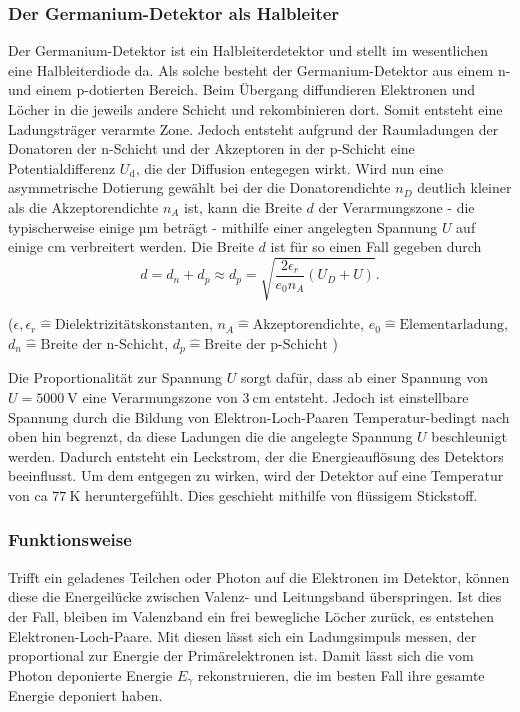 \subsubsection{Der Germanium-Detektor als Halbleiter}
Der Germanium-Detektor ist ein Halbleiterdetektor und stellt im wesentlichen eine Halbleiterdiode da. Als solche besteht der Germanium-Detektor aus einem n- und einem p-dotierten Bereich. Beim Übergang diffundieren Elektronen und Löcher in die jeweils andere Schicht und rekombinieren dort. Somit entsteht eine Ladungsträger verarmte Zone. Jedoch entsteht aufgrund der Raumladungen der Donatoren der n-Schicht und der Akzeptoren in der p-Schicht eine Potentialdifferenz $U_\text{d}$, die der Diffusion entegegen wirkt. Wird nun eine asymmetrische Dotierung gewählt bei der die Donatorendichte $n_D$ deutlich kleiner als die Akzeptorendichte $n_A$ ist, kann die Breite $d$ der Verarmungszone - die typischerweise einige µm beträgt - mithilfe einer angelegten Spannung $U$ auf einige cm verbreitert werden. Die Breite $d$ ist für so einen Fall gegeben durch
\begin{equation}
 d = d_n + d_p \approx d_p = \sqrt{\frac{2 \epsilon_r }{e_0 n_A}(U_D + U)}.
\end{equation}
\begin{center}
\tiny{($ \epsilon, \epsilon_r \hat{=} \text{Dielektrizitätskonstanten} $, $ n_A \hat{=} \text{Akzeptorendichte} $, $e_0 \hat{=} \text{Elementarladung} $, $d_n \hat{=} \text{Breite der n-Schicht}$, $d_p \hat{=} \text{Breite der p-Schicht}$ )}
\end{center}
Die Proportionalität zur Spannung $U$ sorgt dafür, dass ab einer Spannung von $U = \SI{5000}{\volt}$ eine Verarmungszone von  $\SI{3}{\centi \meter}$ entsteht. Jedoch ist einstellbare Spannung durch die Bildung von Elektron-Loch-Paaren Temperatur-bedingt nach oben hin begrenzt, da diese Ladungen die die angelegte Spannung $U$ beschleunigt werden. Dadurch entsteht ein Leckstrom, der die Energieauflösung des Detektors beeinflusst. Um dem entgegen zu wirken, wird der Detektor auf eine Temperatur von ca $\SI{77}{\kelvin}$ heruntergefühlt. Dies geschieht mithilfe von flüssigem Stickstoff. \\

\subsubsection{Funktionsweise}
Trifft ein geladenes Teilchen oder Photon auf die Elektronen im Detektor, können diese die Energeilücke zwischen Valenz- und Leitungsband überspringen. Ist dies der Fall, bleiben im Valenzband ein frei bewegliche Löcher zurück, es entstehen Elektronen-Loch-Paare. Mit diesen lässt sich ein Ladungsimpuls messen, der proportional zur Energie der Primärelektronen ist. Damit lässt sich die vom Photon deponierte Energie $E_\gamma$ rekonstruieren, die im besten Fall ihre gesamte Energie deponiert haben. 

